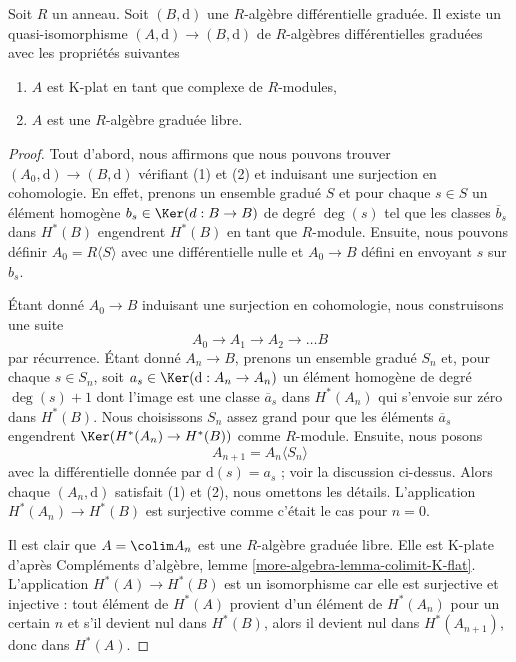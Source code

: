 \begin{lemma}
\label{lemma-K-flat-resolution}
Soit $R$ un anneau. Soit $(B, \text{d})$ une $R$-algèbre différentielle
graduée. Il existe un quasi-isomorphisme $(A, \text{d}) \to (B, \text{d})$ de
$R$-algèbres différentielles graduées avec les propriétés suivantes
\begin{enumerate}
\item $A$ est K-plat en tant que complexe de $R$-modules,
\item $A$ est une $R$-algèbre graduée libre.
\end{enumerate}
\end{lemma}

\begin{proof}
Tout d'abord, nous affirmons que nous pouvons trouver $(A_0, \text{d}) \to
(B, \text{d})$ vérifiant (1) et (2) et induisant une surjection
en cohomologie. En effet, prenons un ensemble gradué $S$ et pour
chaque $s \in S$ un élément homogène $b_s \in \Ker(d : B \to B)$ de degré $\deg(s)$
tel que les classes $\overline{b}_s$ dans $H^*(B)$
engendrent $H^*(B)$ en tant que $R$-module.
Ensuite, nous pouvons définir $A_0 = R\langle S \rangle$ avec une différentielle nulle
et $A_0 \to B$ défini en envoyant $s$ sur $b_s$.

\medskip\noindent
Étant donné $A_0 \to B$ induisant une surjection en cohomologie, nous
construisons une suite
$$
A_0 \to A_1 \to A_2 \to \ldots B
$$
par récurrence. Étant donné $A_n \to B$, prenons un ensemble gradué
$S_n$ et, pour chaque $s \in S_n$, soit $a_s \in \Ker(\text{d} : A_n \to A_n)$
un élément homogène de degré $\deg(s) + 1$ dont l'image
est une classe $\overline{a}_s$ dans $H^*(A_n)$ qui
s'envoie sur zéro dans $H^*(B)$. Nous choisissons $S_n$ assez grand pour
que les éléments $\overline{a}_s$ engendrent $\Ker(H^*(A_n) \to H^*(B))$ comme
$R$-module. Ensuite, nous posons
$$
A_{n + 1} = A_n\langle S_n \rangle
$$
avec la différentielle donnée par $\text{d}(s) = a_s$ ; voir la discussion
ci-dessus. Alors chaque $(A_n, \text{d})$ satisfait (1) et (2), nous omettons les détails.
L'application $H^*(A_n) \to H^*(B)$ est surjective comme c'était le cas pour $n = 0$.

\medskip\noindent
Il est clair que $A = \colim A_n$ est une $R$-algèbre graduée libre.
Elle est K-plate d'après Compléments d'algèbre, lemme \ref{more-algebra-lemma-colimit-K-flat}.
L'application $H^*(A) \to H^*(B)$ est un isomorphisme car elle est surjective et
injective : tout élément de $H^*(A)$ provient d'un élément de $H^*(A_n)$
pour un certain $n$ et s'il devient nul dans $H^*(B)$, alors il devient nul
dans $H^*(A_{n + 1})$, donc dans $H^*(A)$.
\end{proof}

